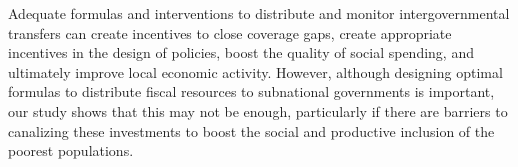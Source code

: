 \documentclass[dv_diss_main.tex]{subfiles}
\begin{document}
Adequate formulas and interventions to distribute and monitor intergovernmental transfers can create incentives to close coverage gaps, create appropriate incentives in the design of policies, boost the quality of social spending, and ultimately improve local economic activity. However, although designing optimal formulas to distribute fiscal resources to subnational governments is important, our study shows that this may not be enough, particularly if there are barriers to canalizing these investments to boost the social and productive inclusion of the poorest populations.
\end{document}

